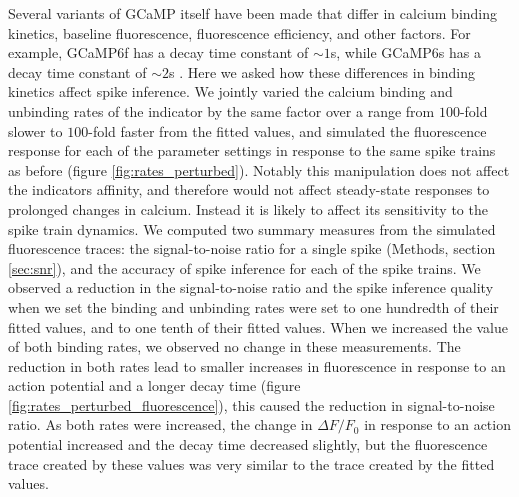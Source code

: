 Several variants of GCaMP itself have been made that differ in calcium binding kinetics, baseline fluorescence, fluorescence efficiency, and other factors. For example, GCaMP6f has a decay time constant of $\sim 1$s, while GCaMP6s has a decay time constant of $\sim 2$s  \parencite{chen}. Here we asked how these differences in binding kinetics affect spike inference. We jointly varied the calcium binding and unbinding rates of the indicator by the same factor over a range from $100$-fold slower to $100$-fold faster from the fitted values, and simulated the fluorescence response for each of the parameter settings in response to the same spike trains as before (figure \ref{fig:rates_perturbed}). Notably this manipulation does not affect the indicators affinity, and therefore would not affect steady-state responses to prolonged changes in calcium. Instead it is likely to affect its sensitivity to the spike train dynamics. We computed two summary measures from the simulated fluorescence traces: the signal-to-noise ratio for a single spike (Methods, section \ref{sec:snr}), and the accuracy of spike inference for each of the spike trains. We observed a reduction in the signal-to-noise ratio and the spike inference quality when we set the binding and unbinding rates were set to one hundredth of their fitted values, and to one tenth of their fitted values. When we increased the value of both binding rates, we observed no change in these measurements. The reduction in both rates lead to smaller increases in fluorescence in response to an action potential and a longer decay time (figure \ref{fig:rates_perturbed_fluorescence}), this caused the reduction in signal-to-noise ratio. As both rates were increased, the change in $\Delta F/F_0$ in response to an action potential increased and the decay time decreased slightly, but the fluorescence trace created by these values was very similar to the trace created by the fitted values.

